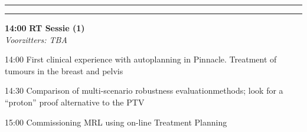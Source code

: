 \documentclass[a4paper,10pt]{report}
\begin{document}
\begin{multicols*}{3}


\vfill

\hrule \vspace{2mm}
\vspace{2mm}\hrule\strut

\begin{packed_enum}
\item[\textbf{14:00}] \textbf{RT Sessie (1)}\\\textit{Voorzitters: TBA}
\item[14:00] First clinical experience with autoplanning in Pinnacle. Treatment of tumours in the breast and pelvis
\item[14:30] Comparison of multi-scenario robustness evaluationmethods; look for a ``proton'' proof alternative to the PTV
\item[15:00] Commissioning MRL using on-line Treatment Planning
\end{packed_enum} %

\vfill 


\end{multicols*}
\end{document}
